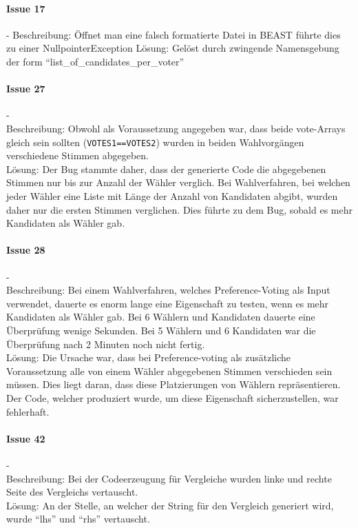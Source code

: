 \documentclass[a4paper]{scrreprt}
\begin{document}
\paragraph{Issue 17}- \newline
Beschreibung: Öffnet man eine falsch formatierte Datei in BEAST führte dies zu
einer NullpointerException
\newline
Lösung: Gelöst durch zwingende Namensgebung der form
"`list_of_candidates_per_voter"' 

\paragraph{Issue 27}- \\
Beschreibung: Obwohl als Voraussetzung angegeben war, dass beide vote-Arrays gleich sein sollten (\verb!VOTES1==VOTES2!) wurden in beiden Wahlvorgängen verschiedene Stimmen abgegeben.\\
Lösung: Der Bug stammte daher, dass der generierte Code die abgegebenen Stimmen nur bis zur Anzahl der Wähler verglich. Bei Wahlverfahren, bei welchen jeder Wähler eine Liste mit Länge der Anzahl von Kandidaten abgibt, wurden daher nur die ersten Stimmen verglichen. Dies führte zu dem Bug, sobald es mehr Kandidaten als Wähler gab.

\paragraph{Issue 28}- \\
Beschreibung: Bei einem Wahlverfahren, welches Preference-Voting als Input verwendet, dauerte es enorm lange eine Eigenschaft zu testen, wenn es mehr Kandidaten als Wähler gab. Bei 6 Wählern und Kandidaten dauerte eine Überprüfung wenige Sekunden. Bei 5 Wählern und 6 Kandidaten war die Überprüfung nach 2 Minuten noch nicht fertig.\\
Lösung: Die Ursache war, dass bei Preference-voting als zusätzliche Voraussetzung alle von einem Wähler abgegebenen Stimmen verschieden sein müssen. Dies liegt daran, dass diese Platzierungen von Wählern repräsentieren. Der Code, welcher produziert wurde, um diese Eigenschaft sicherzustellen, war fehlerhaft.

\paragraph{Issue 42}- \\
Beschreibung: Bei der Codeerzeugung für Vergleiche wurden linke und rechte Seite des Vergleichs vertauscht.\\
Lösung: An der Stelle, an welcher der String für den Vergleich generiert wird, wurde "`lhs"' und "`rhs"' vertauscht. 
 
\end{document}
